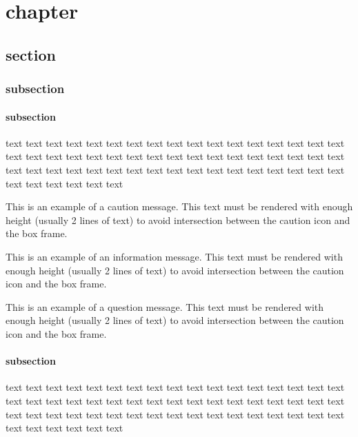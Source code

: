 \documentclass[report, backcover, french, nodocumentinfo]{upmethodology-document}
\begin{document}
	\upmdocumentsummary{}
	\upmdocumentauthors{}
	\upmdocumentinformedpeople{}
	\upmpublicationpage{}
	\tableofcontents{}
	\newpage{}

	\chapter{chapter}
		\section{section}
			\subsection{subsection}
				\subsubsection{subsection}
						text text text text text text text text text text text text text text text text text text text text text text text text text text text text text text text text text text text text text text text text text text text text text text text text text text text text text text text text text
						\begin{upmcaution}
							This is an example of a caution message. This text must be rendered with enough height (usually 2 lines of text) to avoid intersection between the caution icon and the box frame.
						\end{upmcaution}
						\begin{upminfo}
							This is an example of an information message. This text must be rendered with enough height (usually 2 lines of text) to avoid intersection between the caution icon and the box frame.
						\end{upminfo}
						\begin{upmquestion}
							This is an example of a question message. This text must be rendered with enough height (usually 2 lines of text) to avoid intersection between the caution icon and the box frame.
						\end{upmquestion}
				\subsubsection{subsection}
						text text text text text text text text text text text text text text text text text text text text text text text text text text text text text text text text text text text text text text text text text text text text text text text text text text text text text text text text text
\end{document}
